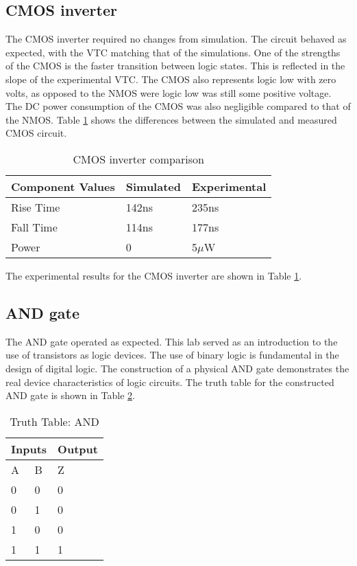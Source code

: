 \subsection{CMOS inverter}
The CMOS inverter required no changes from simulation. The circuit behaved as expected, with the VTC matching that of the simulations. One of the strengths of the CMOS is the faster transition between logic states. This is reflected in the slope of the experimental VTC. The CMOS also represents logic low with zero volts, as opposed to the NMOS were logic low was still some positive voltage. The DC power consumption of the CMOS was also negligible compared to that of the NMOS. Table \ref{tab:cmosexpvsim} shows the differences between the simulated and measured CMOS circuit.

\begin{table}[H]
	\centering
	\caption{CMOS inverter comparison}
	\label{tab:cmosexpvsim}
	\begin{tabular}{|l|l|l|}
		\hline
		Component Values & Simulated & Experimental \\ \hline
		Rise Time        & 142ns     & 235ns        \\ \hline
		Fall Time        & 114ns     & 177ns        \\ \hline
		Power            & 0         & 5$\mu$W      \\ \hline
	\end{tabular}
\end{table}

The experimental results for the CMOS inverter are shown in Table \ref{tab:cmosexpvsim}.

\subsection{AND gate}
The AND gate operated as expected. This lab served as an introduction to the use of transistors as logic devices. The use of binary logic is fundamental in the design of digital logic. The construction of a physical AND gate demonstrates the real device characteristics of logic circuits. The truth table for the constructed AND gate is shown in Table \ref{tab:truthANDdis}.

\begin{table}[H]
\centering
\caption{Truth Table: AND}
\label{tab:truthANDdis}
\begin{tabular}{|l|l|l|}
\hline
\multicolumn{2}{|l|}{Inputs} & Output \\ \hline
A             & B            & Z      \\ \hline
0             & 0            & 0      \\ \hline
0             & 1            & 0      \\ \hline
1             & 0            & 0      \\ \hline
1             & 1            & 1      \\ \hline
\end{tabular}
\end{table}



